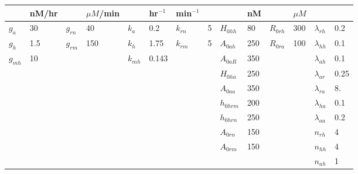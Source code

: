 \documentclass{article}
\begin{document}
\begin{table}[ht]
\begin{tabular}{ll|ll|ll|ll|ll|ll|ll}
                & nM/hr &               & $\mu M$/min   &               & hr$^{-1}$     & min$^{-1}$    &       &               & nM    &               & $\mu M$       &                       & \\
\hline
$g_a$           & 30    & $g_{rn}$      & 40            & $k_a$         & 0.2           & $k_{rn}$      & 5     & $H_{0hh}$     & 80    &  $R_{0rh}$    & 300           & $\lambda_{rh}$        & 0.2   \\
$g_h$           & 1.5   & $g_{rm}$      & 150           & $k_h$         & 1.75          & $k_{rm}$      & 5     & $A_{0ah}$     & 250   &  $R_{0ra}$    & 100           & $\lambda_{hh}$        & 0.1   \\
$g_{mh}$        & 10    &               &               & $k_{mh}$      & 0.143         &               &       & $A_{0aR}$     & 350   &               &               & $\lambda_{ah}$        & 0.1   \\
                &       &               &               &               &               &               &       & $H_{0ha}$     & 250   &               &               & $\lambda_{ar}$        & 0.25  \\
                &       &               &               &               &               &               &       & $A_{0aa}$     & 350   &               &               & $\lambda_{ra}$        & 8.    \\
                &       &               &               &               &               &               &       & $h_{0hrm}$    & 200   &               &               & $\lambda_{ha}$        & 0.1   \\
                &       &               &               &               &               &               &       & $h_{0hrn}$    & 250   &               &               & $\lambda_{aa}$        & 0.2   \\
                &       &               &               &               &               &               &       & $A_{0rn}$     & 150   &               &               & $n_{rh}$      & 4     \\
                &       &               &               &               &               &               &       & $A_{0rm}$     & 150   &               &               & $n_{hh}$      & 4     \\
                &       &               &               &               &               &               &       &               &       &               &               & $n_{ah}$      & 1     \\

\end{tabular}
\end{table}
\end{document}
